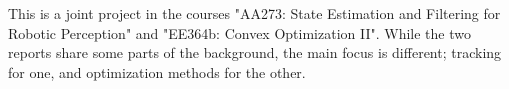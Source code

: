This is a joint project in the courses "AA273: State Estimation and Filtering for Robotic Perception" and "EE364b: Convex Optimization II". While the two reports share some parts of the background, the main focus is different; tracking for one, and optimization methods for the other.